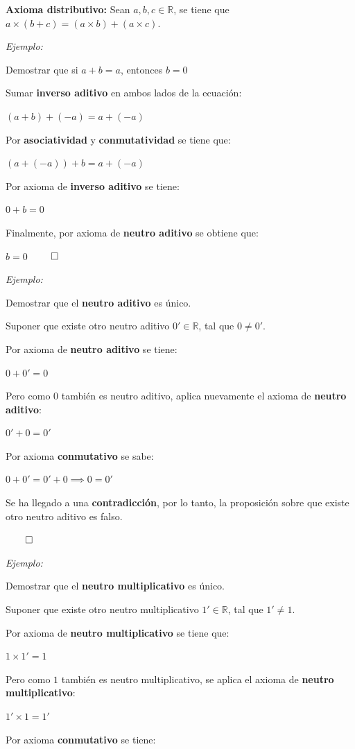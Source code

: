 \documentclass{article}
\begin{document}
\textbf{Axioma distributivo:} Sean $a, b, c \in \mathbb{R}$, se tiene que $a \times (b + c) = (a \times b) + (a \times c)$.

\textit{Ejemplo:}

Demostrar que si $a + b = a$, entonces $b = 0$

Sumar \textbf{inverso aditivo} en ambos lados de la ecuación:

$(a + b) + (-a) = a + (-a)$

Por \textbf{asociatividad} y \textbf{conmutatividad} se tiene que:

$(a + (-a)) + b = a + (-a)$


Por axioma de \textbf{inverso aditivo} se tiene:

$0 + b = 0$

Finalmente, por axioma de \textbf{neutro aditivo} se obtiene que:

$b = 0$ $\qed$

\textit{Ejemplo:}

Demostrar que el \textbf{neutro aditivo} es único.

Suponer que existe otro neutro aditivo $0' \in \mathbb{R}$, tal que $0 \neq 0'$.

Por axioma de \textbf{neutro aditivo} se tiene:

$0 + 0' = 0$

Pero como $0$ también es neutro aditivo, aplica nuevamente el axioma de \textbf{neutro aditivo}:

$0' + 0 = 0'$

Por axioma \textbf{conmutativo} se sabe:

$0 + 0' = 0' + 0 \implies 0 = 0'$

Se ha llegado a una \textbf{contradicción}, por lo tanto, la proposición sobre que existe otro neutro aditivo es falso.

$\qed$

\textit{Ejemplo:}

Demostrar que el \textbf{neutro multiplicativo} es único.

Suponer que existe otro neutro multiplicativo $1' \in \mathbb{R}$, tal que $1' \neq 1$.

Por axioma de \textbf{neutro multiplicativo} se tiene que:

$1 \times 1' = 1$

Pero como $1$ también es neutro multiplicativo, se aplica el axioma de \textbf{neutro multiplicativo}:

$1' \times 1 = 1'$

Por axioma \textbf{conmutativo} se tiene:
\end{document}
